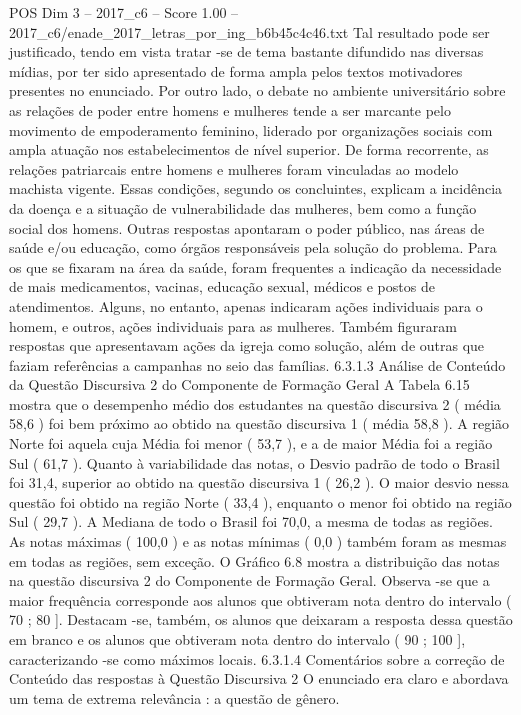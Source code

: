 \begin{textsample}{POS Dim 3 – 2017\_c6 – Score 1.00 – 2017\_c6/enade\_2017\_letras\_por\_ing\_b6b45c4c46.txt}
Tal resultado pode ser justificado, tendo em vista tratar -se de tema bastante difundido nas diversas mídias, por ter sido apresentado de forma ampla pelos textos motivadores presentes no enunciado.
Por outro lado, o debate no ambiente universitário sobre as relações de poder entre homens e mulheres tende a ser marcante pelo movimento de empoderamento feminino, liderado por organizações sociais com ampla atuação nos estabelecimentos de nível superior.
De forma recorrente, as relações patriarcais entre homens e mulheres foram vinculadas ao modelo machista vigente.
Essas condições, segundo os concluintes, explicam a incidência da doença e a situação de vulnerabilidade das mulheres, bem como a função social dos homens.
Outras respostas apontaram o poder público, nas áreas de saúde e/ou educação, como órgãos responsáveis pela solução do problema.
Para os que se fixaram na área da saúde, foram frequentes a indicação da necessidade de mais medicamentos, vacinas, educação sexual, médicos e postos de atendimentos.
Alguns, no entanto, apenas indicaram ações individuais para o homem, e outros, ações individuais para as mulheres.
Também figuraram respostas que apresentavam ações da igreja como solução, além de outras que faziam referências a campanhas no seio das famílias. 6.3.1.3 Análise de Conteúdo da Questão Discursiva 2 do Componente de Formação Geral A Tabela 6.15 mostra que o desempenho médio dos estudantes na questão discursiva 2 ( média 58,6 ) foi bem próximo ao obtido na questão discursiva 1 ( média 58,8 ).
A região Norte foi aquela cuja Média foi menor ( 53,7 ), e a de maior Média foi a região Sul ( 61,7 ).
Quanto à variabilidade das notas, o Desvio padrão de todo o Brasil foi 31,4, superior ao obtido na questão discursiva 1 ( 26,2 ).
O maior desvio nessa questão foi obtido na região Norte ( 33,4 ), enquanto o menor foi obtido na região Sul ( 29,7 ).
A Mediana de todo o Brasil foi 70,0, a mesma de todas as regiões.
As notas máximas ( 100,0 ) e as notas mínimas ( 0,0 ) também foram as mesmas em todas as regiões, sem exceção.
O Gráfico 6.8 mostra a distribuição das notas na questão discursiva 2 do Componente de Formação Geral.
Observa -se que a maior frequência corresponde aos alunos que obtiveram nota dentro do intervalo ( 70 ; 80 ].
Destacam -se, também, os alunos que deixaram a resposta dessa questão em branco e os alunos que obtiveram nota dentro do intervalo ( 90 ; 100 ], caracterizando -se como máximos locais. 6.3.1.4 Comentários sobre a correção de Conteúdo das respostas à Questão Discursiva 2 O enunciado era claro e abordava um tema de extrema relevância : a questão de gênero.

\end{textsample}
